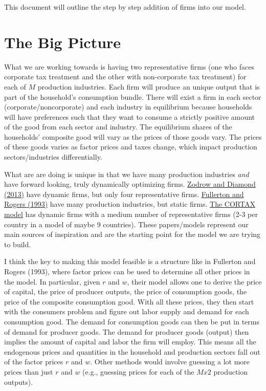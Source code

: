 \documentclass[letterpaper,12pt]{article}
\theoremstyle{definition}
\begin{document}
This document will outline the step by step addition of firms into our model.

\section*{The Big Picture}

What we are working towards is having two representative firms (one who faces corporate tax treatment and the other with non-corporate tax treatment) for each of $M$ production industries.  Each firm will produce an unique output that is part of the household's consumption bundle.  There will exist a firm in each sector (corporate/noncorporate) and each industry in equilibrium because households will have preferences such that they want to consume a strictly positive amount of the good from each sector and industry.  The equilibrium shares of the households' composite good will vary as the prices of those goods vary.  The prices of these goods varies as factor prices and taxes change, which impact production sectors/industries differentially.

What are are doing is unique in that we have many production industries \emph{and} have forward looking, truly dynamically optimizing firms.  \href{https://github.com/OpenSourcePolicyCenter/dynamic/blob/master/Papers/ZodrowDiamond2013.pdf}{Zodrow and Diamond (2013)} have dynamic firms, but only four representative firms.  \href{https://github.com/OpenSourcePolicyCenter/dynamic/blob/master/Papers/FullertonRogers1993.pdf}{Fullerton and Rogers (1993)} have many production industries, but static firms.  \href{https://github.com/OpenSourcePolicyCenter/dynamic/blob/master/Papers/memo161.pdf}{The CORTAX model} has dynamic firms with a medium number of representative firms (2-3 per country in a model of maybe 9 countries).  These papers/models represent our main sources of inspiration and are the starting point for the model we are trying to build.

I think the key to making this model feasible is a structure like in Fullerton and Rogers (1993), where factor prices can be used to determine all other prices in the model.  In particular, given $r$ and $w$, their model allows one to derive the price of capital, the price of producer outputs, the price of consumption goods, the price of the composite consumption good.  With all these prices, they then start with the consumers problem and figure out labor supply and demand for each consumption good.  The demand for consumption goods can then be put in terms of demand for producer goods.  The demand for producer goods (output) then implies the amount of capital and labor the firm will employ.  This means all the endogenous prices and quantities in the household and production sectors fall out of the factor prices $r$ and $w$.  Other methods would involve guessing a lot more prices than just $r$ and $w$ (e.g., guessing prices for each of the $Mx2$ production outputs).
\end{document}
